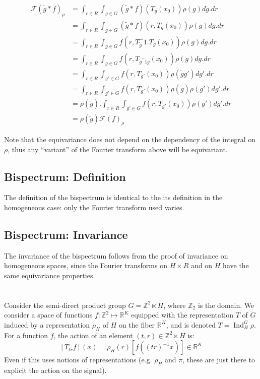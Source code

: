 \documentclass{article}
\begin{document}
\begin{align*}
  \mathcal{F}(\tilde{g} \ast f)_{\rho}
    &= \int_{r \in R} \int_{g \in G} (\tilde{g} \ast f)\left(T_g(x_0)\right) \rho(g)dg. dr \\
    &= \int_{r \in R} \int_{g \in G} (\tilde{g} \ast f)\left(r, T_g(x_0)\right) \rho(g)dg. dr \\
    &= \int_{r \in R} \int_{g \in G} f(r, T_{\tilde{g}}^-1.T_g(x_0)) \rho(g)dg. dr \\
    &= \int_{r \in R} \int_{g \in G} f(r, T_{\tilde{g}^-1g}(x_0)) \rho(g)dg. dr \\
    &= \int_{r \in R} \int_{g' \in G} f(r, T_{g'}(x_0)) \rho(\tilde{g}g')dg'. dr \\
    &= \int_{r \in R} \int_{g' \in G} f(r, T_{g'}(x_0)) \rho(\tilde{g})\rho(g')dg'. dr \\
    &= \rho(\tilde{g}). \int_{r \in R} \int_{g' \in G} f(r, T_{g'}(x_0)) \rho(g')dg'. dr \\
    &= \rho(\tilde{g}) \mathcal{F}(f)_{\rho}
\end{align*}


Note that the equivariance does not depend on the dependency of the integral on $\rho$, thus any ``variant'' of the Fourier transform above will be equivariant.

\subsection{Bispectrum: Definition}

The definition of the bispectrum is identical to the its definition in the homogeneous case: only the Fourier transform used varies.

\subsection{Bispectrum: Invariance}

The invariance of the bispectrum follows from the proof of invariance on homogeneous spaces, since the Fourier transforms on $H \times R$ and on $H$ have the same equivariance properties.

\section{}

Consider the semi-direct product group $G = \mathbb{Z}^2 \ltimes H$, where $\mathbb{Z}_2$ is the domain. We consider a space of functions $f:\mathbb{Z}^2 \mapsto \mathbb{R}^K$ equipped with the representation $T$ of $G$ induced by a representation $\rho_H$ of $H$ on the fiber $\mathbb{R}^K$, and is denoted $T=\operatorname{Ind}_H^G \rho$. For a function $f$, the action of an element $(t, r) \in \mathbb{Z}^2 \ltimes H$ is:
\begin{equation}
    \left[T_{t r} f\right](x)=\rho_H(r)\left[f\left((t r)^{-1} x\right)\right] \in \mathbb{R}^K
\end{equation}
Even if this uses notions of representations (e.g. $\rho_H$ and $\pi$, these are just there to explicit the action on the signal).
\end{document}
